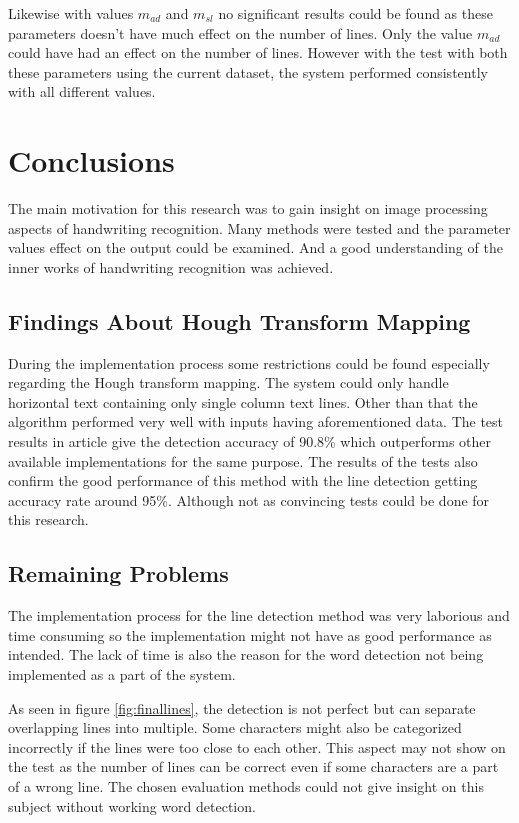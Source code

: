 \documentclass{article}
\begin{document}
    Likewise with values $m_{ad}$ and $m_{sl}$ no significant results could be found as these parameters doesn't have much effect on the number of lines. Only the value $m_{ad}$ could have had an effect on the number of lines. However with the test with both these parameters using the current dataset, the system performed consistently with all different values.

  \newpage
  \section{Conclusions}
    The main motivation for this research was to gain insight on image processing aspects of handwriting recognition. Many methods were tested and the parameter values effect on the output could be examined. And a good understanding of the inner works of handwriting recognition was achieved.

    \subsection{Findings About Hough Transform Mapping}
      During the implementation process some restrictions could be found especially regarding the Hough transform mapping. The system could only handle horizontal text containing only single column text lines. Other than that the algorithm performed very well with inputs having aforementioned data. The test results in article \cite{Louloudis2} give the detection accuracy of 90.8\% which outperforms other available implementations for the same purpose. The results of the tests also confirm the good performance of this method with the line detection getting accuracy rate around 95\%. Although not as convincing tests could be done for this research.

    \subsection{Remaining Problems}
      The implementation process for the line detection method was very laborious and time consuming so the implementation might not have as good performance as intended. The lack of time is also the reason for the word detection not being implemented as a part of the system.

      As seen in figure \ref{fig:finallines}, the detection is not perfect but can separate overlapping lines into multiple. Some characters might also be categorized incorrectly if the lines were too close to each other. This aspect may not show on the test as the number of lines can be correct even if some characters are a part of a wrong line. The chosen evaluation methods could not give insight on this subject without working word detection.
\end{document}
